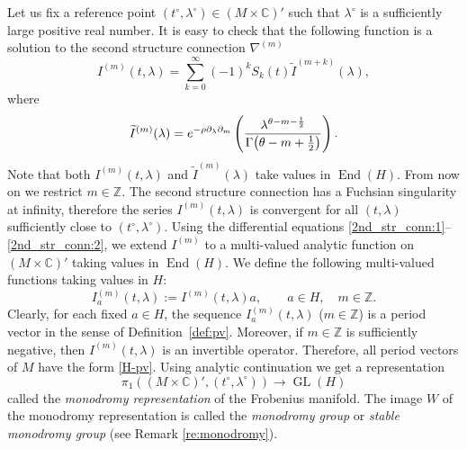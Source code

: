 \documentclass[10pt,a4paper]{article}
\numberwithin{equation}{section}
\newcommand{\CC}{\mathbb{C}}
\newcommand{\ZZ}{\mathbb{Z}}
\newcommand{\op}{\operatorname}
\begin{document}
Let us fix a reference point $(t^\circ,\lambda^\circ)\in (M\times
\CC)'$ such that $\lambda^\circ$ is a sufficiently
large positive real number. It is
easy to check that the following function is a solution to the second
structure connection $\nabla^{(m)}$
\begin{equation}\label{fundamental_period}
I^{(m)}(t,\lambda) = \sum_{k=0}^\infty (-1)^k S_k(t) \widetilde{I}^{(m+k)}(\lambda),
\end{equation}
where
\[%
\widetilde{I}^{(m)}(\lambda) = {\rm e}^{-\rho \partial_\lambda \partial_m}
\left(
\frac{\lambda^{\theta-m-\frac{1}{2}} }{ \Gamma\big(\theta-m+\frac{1}{2}\big) }
\right).
\]
Note that both $I^{(m)}(t,\lambda)$ and $\widetilde{I}^{(m)}(\lambda)$
take values in $\op{End}(H)$. From now on we restrict ${m\in \ZZ}$.
The second structure connection has a
Fuchsian singularity at infinity, therefore the series ${I^{(m)}(t,\lambda)}$ is
convergent for all $(t,\lambda)$ sufficiently close to
$(t^\circ,\lambda^\circ)$. Using the differential equations
\eqref{2nd_str_conn:1}--\eqref{2nd_str_conn:2}, we extend
$I^{(m)}$ to a multi-valued analytic function on $(M\times \CC)'$
taking values in $\op{End}(H)$. We define the following multi-valued
functions taking values in $H$:
\begin{equation}\label{H-pv}
I^{(m)}_a(t,\lambda):=I^{(m)}(t,\lambda) a,
\qquad a\in H,\quad m\in \ZZ.
\end{equation}
Clearly, for each fixed $a\in H$, the sequence $I^{(m)}_a(t,\lambda)$
($m\in \ZZ$) is a period vector in the sense of Definition~\ref{def:pv}. Moreover, if $m\in \ZZ$ is sufficiently negative, then
$I^{(m)}(t,\lambda)$ is an invertible operator. Therefore, all period
vectors of $M$ have the form \eqref{H-pv}. Using analytic
continuation we get a representation
\[%
\pi_1((M\times\CC)',(t^\circ,\lambda^\circ) )\to \operatorname{GL}(H)
\]
called the {\em monodromy representation} of the Frobenius
manifold. The image $W$ of the monodromy representation is called the
{\em monodromy group} or {\em stable monodromy group} (see Remark
\ref{re:monodromy}).
\end{document}
